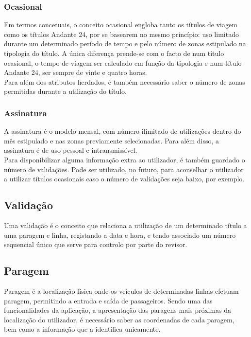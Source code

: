 \subsubsection{Ocasional}

Em termos concetuais, o conceito ocasional engloba tanto os títulos de viagem como os títulos Andante 24, por se basearem no mesmo princípio: uso limitado durante um determinado período de tempo e pelo número de zonas estipulado na tipologia do título. A única diferença prende-se com o facto de num título ocasional, o tempo de viagem ser calculado em função da tipologia e num título Andante 24, ser sempre de vinte e quatro horas.
\\Para além dos atributos herdados, é também necessário saber o número de zonas permitidas durante a utilização do título.

\subsubsection{Assinatura}

A assinatura é o modelo mensal, com número ilimitado de utilizações dentro do mês estipulado e nas zonas previamente selecionadas. Para além disso, a assinatura é de uso pessoal e intransmissível.
\\Para disponibilizar alguma informação extra ao utilizador, é também guardado o número de validações. Pode ser utilizado, no futuro, para aconselhar o utilizador a utilizar títulos ocasionais caso o número de validações seja baixo, por exemplo.

\subsection{Validação}
Uma validação é o conceito que relaciona a utilização de um determinado título a uma paragem e linha, registando a data e hora, e tendo associado um número sequencial único que serve para controlo por parte do revisor.

\subsection{Paragem}
Paragem é a localização física onde os veículos de determinadas linhas efetuam paragem, permitindo a entrada e saída de passageiros. Sendo uma das funcionalidades da aplicação, a apresentação das paragens mais próximas da localização do utilizador, é necessário saber as coordenadas de cada paragem, bem como a informação que a identifica unicamente.

